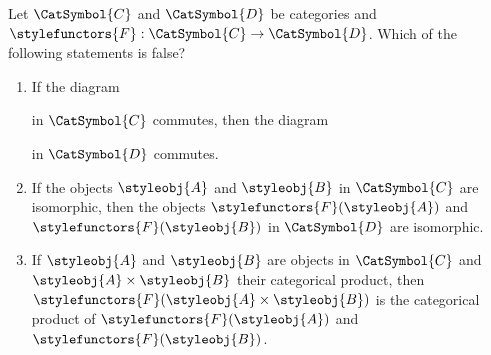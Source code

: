 \begin{quiz}
Let $\CatSymbol{C}$ and $\CatSymbol{D}$ be categories and $\stylefunctors{F}:\CatSymbol{C}\to\CatSymbol{D}$. Which of the following statements is false?
\begin{enumerate}[label=(\alph*)]
\item If the diagram 
in $\CatSymbol{C}$ commutes, then the diagram 
in $\CatSymbol{D}$ commutes.
\item If the objects $\styleobj{A}$ and $\styleobj{B}$ in $\CatSymbol{C}$ are isomorphic, then the objects $\stylefunctors{F}(\styleobj{A})$ and $\stylefunctors{F}(\styleobj{B})$ in $\CatSymbol{D}$ are isomorphic.
\item If $\styleobj{A}$ and $\styleobj{B}$ are objects in $\CatSymbol{C}$ and $\styleobj{A}\times\styleobj{B}$ their categorical product, then $\stylefunctors{F}(\styleobj{A}\times\styleobj{B})$ is the categorical product of $\stylefunctors{F}(\styleobj{A})$ and $\stylefunctors{F}(\styleobj{B})$.
\end{enumerate}
\end{quiz}

